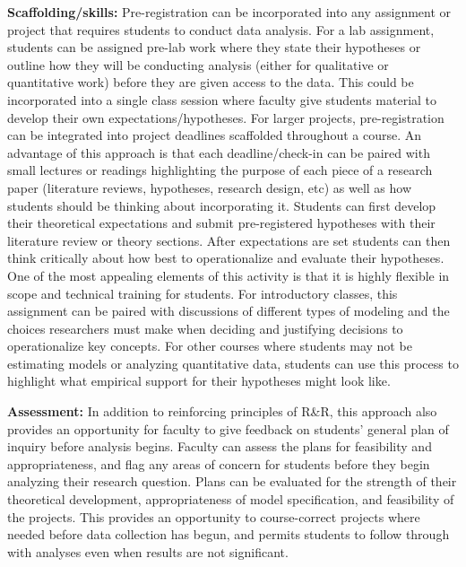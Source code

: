 \documentclass[
  12pt]{article}
\begin{document}
\textbf{Scaffolding/skills:} Pre-registration can be incorporated into any assignment or project that requires students to conduct data analysis. 
For a lab assignment, students can be assigned pre-lab work where they state their hypotheses or outline how they will be conducting analysis (either for qualitative or quantitative work) before they are given access to the data. 
This could be incorporated into a single class session where faculty give students material to develop their own expectations/hypotheses. 
For larger projects, pre-registration can be integrated into project deadlines scaffolded throughout a course. 
An advantage of this approach is that each deadline/check-in can be paired with small lectures or readings highlighting the purpose of each piece of a research paper (literature reviews, hypotheses, research design, etc) as well as how students should be thinking about incorporating it. 
Students can first develop their theoretical expectations and submit pre-registered hypotheses with their literature review or theory sections. 
After expectations are set students can then think critically about how best to operationalize and evaluate their hypotheses. 
One of the most appealing elements of this activity is that it is highly flexible in scope and technical training for students. 
For introductory classes, this assignment can be paired with discussions of different types of modeling and the choices researchers must make when deciding and justifying decisions to operationalize key concepts. 
For other courses where students may not be estimating models or analyzing quantitative data, students can use this process to highlight what empirical support for their hypotheses might look like. 

\textbf{Assessment:}
In addition to reinforcing principles of R\&R, this approach also provides an opportunity for faculty to give feedback on students' general plan of inquiry before analysis begins. 
Faculty can assess the plans for feasibility and appropriateness, and flag any areas of concern for students before they begin analyzing their research question. 
Plans can be evaluated for the strength of their theoretical development, appropriateness of model specification, and feasibility of the projects. 
This provides an opportunity to course-correct projects where needed before data collection has begun, and permits students to follow through with analyses even when results are not significant.
\end{document}
